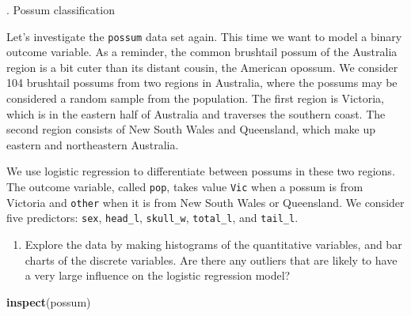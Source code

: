 \documentclass[
]{book}
\newenvironment{Shaded}{\begin{snugshade}}{\end{snugshade}}
\newcommand{\DataTypeTok}[1]{\textcolor[rgb]{0.13,0.29,0.53}{#1}}
\newcommand{\KeywordTok}[1]{\textcolor[rgb]{0.13,0.29,0.53}{\textbf{#1}}}
\newcommand{\NormalTok}[1]{#1}
\newcommand{\OperatorTok}[1]{\textcolor[rgb]{0.81,0.36,0.00}{\textbf{#1}}}
\newcommand{\StringTok}[1]{\textcolor[rgb]{0.31,0.60,0.02}{#1}}
\providecommand{\tightlist}{%
  \setlength{\itemsep}{0pt}\setlength{\parskip}{0pt}}
\begin{document}
. Possum classification

Let's investigate the \texttt{possum} data set again. This time we want to model a binary outcome variable. As a reminder, the common brushtail possum of the Australia region is a bit cuter than its distant cousin, the American opossum. We consider 104 brushtail possums from two regions in Australia, where the possums may be considered a random sample from the population. The first region is Victoria, which is in the eastern half of Australia and traverses the southern coast. The second region consists of New South Wales and Queensland, which make up eastern and northeastern Australia.

We use logistic regression to differentiate between possums in these two regions. The outcome variable, called \texttt{pop}, takes value \texttt{Vic} when a possum is from Victoria and \texttt{other} when it is from New South Wales or Queensland. We consider five predictors: \texttt{sex}, \texttt{head\_l}, \texttt{skull\_w}, \texttt{total\_l}, and \texttt{tail\_l}.

\begin{enumerate}
\def\labelenumi{\alph{enumi}.}
\tightlist
\item
  Explore the data by making histograms of the quantitative variables, and bar charts of the discrete variables. Are there any outliers that are likely to have a very large influence on the logistic regression model?
\end{enumerate}

\begin{Shaded}
\end{Shaded}

\begin{Shaded}
\begin{Highlighting}[]
\KeywordTok{inspect}\NormalTok{(possum)}
\end{Highlighting}
\end{Shaded}
\end{document}
